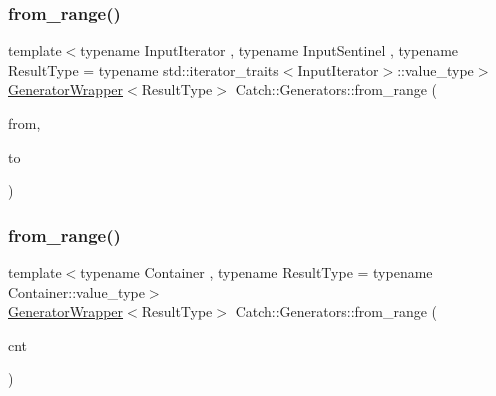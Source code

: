 \mbox{\label{namespace_catch_1_1_generators_a9d2acedb284b77addf4397c1c26918f3}} 
\subsubsection{\texorpdfstring{from\+\_\+range()}{from\_range()}\hspace{0.1cm}{\footnotesize\ttfamily [1/2]}}
{\footnotesize\ttfamily template$<$typename Input\+Iterator , typename Input\+Sentinel , typename Result\+Type  = typename std\+::iterator\+\_\+traits$<$\+Input\+Iterator$>$\+::value\+\_\+type$>$ \\
\mbox{\hyperlink{class_catch_1_1_generators_1_1_generator_wrapper}{Generator\+Wrapper}}$<$Result\+Type$>$ Catch\+::\+Generators\+::from\+\_\+range (\begin{DoxyParamCaption}\item[{Input\+Iterator}]{from,  }\item[{Input\+Sentinel}]{to }\end{DoxyParamCaption})}

\mbox{\label{namespace_catch_1_1_generators_aeb88d6a42add0362432ce03fa35b6dd4}} 
\subsubsection{\texorpdfstring{from\+\_\+range()}{from\_range()}\hspace{0.1cm}{\footnotesize\ttfamily [2/2]}}
{\footnotesize\ttfamily template$<$typename Container , typename Result\+Type  = typename Container\+::value\+\_\+type$>$ \\
\mbox{\hyperlink{class_catch_1_1_generators_1_1_generator_wrapper}{Generator\+Wrapper}}$<$Result\+Type$>$ Catch\+::\+Generators\+::from\+\_\+range (\begin{DoxyParamCaption}\item[{Container const \&}]{cnt }\end{DoxyParamCaption})}

\mbox{\label{namespace_catch_1_1_generators_adbda9e2d18cd3e4dbb124c7d8830c97b}} 
